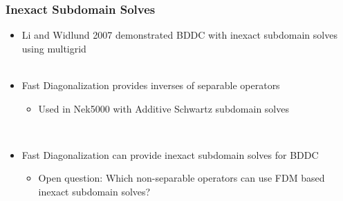\documentclass{beamer}
\begin{document}
\begin{frame}
\begin{center}
\frametitle{Inexact Subdomain Solves}

\begin{itemize}

\item Li and Widlund 2007 demonstrated BDDC with inexact subdomain solves using multigrid\\

~\\

\item Fast Diagonalization provides inverses of separable operators\\

\begin{itemize}

\item Used in Nek5000 with Additive Schwartz subdomain solves

\end{itemize}

~\\

\item Fast Diagonalization can provide inexact subdomain solves for BDDC\\

\begin{itemize}

\item Open question: Which non-separable operators can use FDM based inexact subdomain solves?

\end{itemize}

\end{itemize}

\end{center}
\end{frame}

\end{document}
